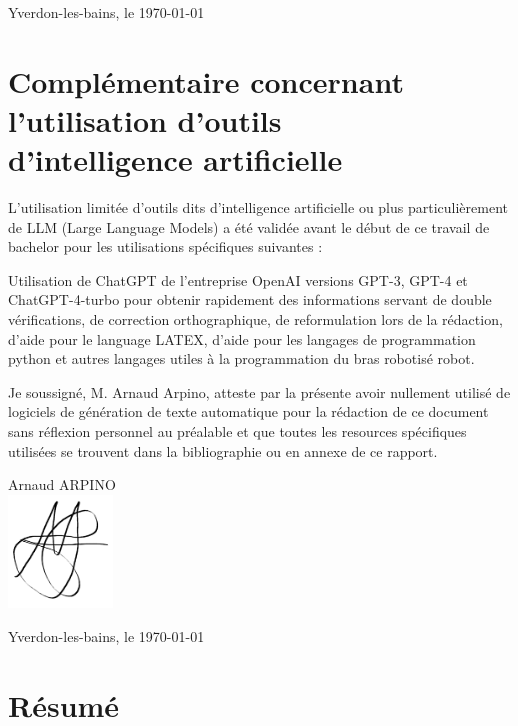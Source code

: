 \vspace{5cm}
Yverdon-les-bains, le \today

\newpage

\clearpage
\null
\thispagestyle{empty}
\clearpage
\newpage

\vspace*{1cm}
\section*{\Huge Complémentaire concernant \\
l'utilisation d'outils\\
d'intelligence artificielle}

\vspace{2cm}

L'utilisation limitée d'outils dits d'intelligence artificielle ou plus particulièrement de
LLM (Large Language Models) a été validée avant le début de ce travail de bachelor
pour les utilisations spécifiques suivantes :

\vspace{1cm}
Utilisation de ChatGPT de l'entreprise OpenAI versions GPT-3, GPT-4 et ChatGPT-4-turbo pour
obtenir rapidement des informations servant de double vérifications, de correction
orthographique, de reformulation lors de la rédaction, d'aide pour le language LATEX, d'aide pour les langages de programmation python et 
autres langages utiles à la programmation du bras robotisé robot. 


\vspace{1cm}
Je soussigné, M. Arnaud Arpino, atteste par la présente avoir nullement utilisé de
logiciels de génération de texte automatique pour la rédaction de ce document sans réflexion personnel
au préalable et que toutes les resources spécifiques utilisées se trouvent dans la bibliographie ou en
annexe de ce rapport.

\vspace{2cm}

\hspace*{10cm}
\begin{minipage}{0.3\textwidth}
    Arnaud ARPINO\\
    \includegraphics[height=3cm]{Images/Signatures/signature Arnaud.png}
\end{minipage}

\vspace{1cm}
Yverdon-les-bains, le \today



\newpage

\clearpage
\null
\thispagestyle{empty}
\clearpage
\newpage

\section*{\Huge Résumé}

\clearpage
\null
\thispagestyle{empty}
\clearpage
\newpage